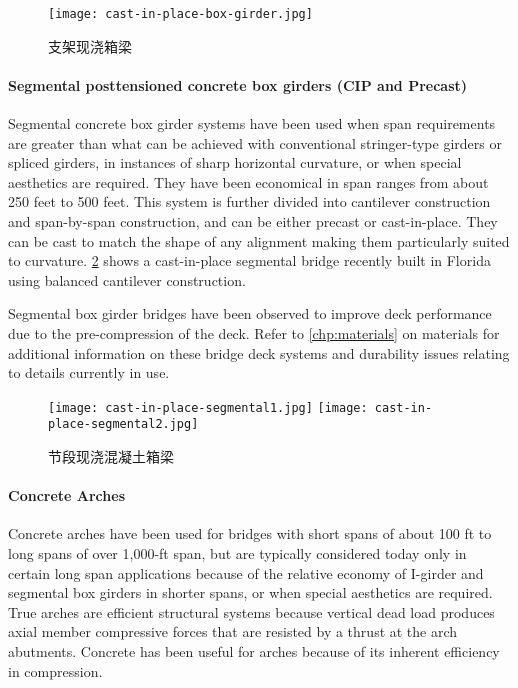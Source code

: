 \begin{figure}
  \texttt{[image: cast-in-place-box-girder.jpg]}
  \caption{支架现浇箱梁}
  \label{fig:cast-in-place-box-girder}
\end{figure}

\paragraph{Segmental posttensioned concrete box girders (CIP and Precast)}

Segmental concrete box girder systems have been used when span requirements are greater than what can be
achieved with conventional stringer-type girders or spliced girders, in instances of sharp horizontal curvature, or
when special aesthetics are required. They have been economical in span ranges from about 250 feet to 500 feet.
This system is further divided into cantilever construction and span-by-span construction, and can be either precast or
cast-in-place. They can be cast to match the shape of any alignment making them particularly suited to curvature.
\cref{fig:cast-in-place-segmental} shows a cast-in-place segmental bridge recently built in Florida using balanced cantilever construction.

Segmental box girder bridges have been observed to improve deck performance due to the pre-compression of
the deck. Refer to \cref{chp:materials} on materials for additional information on these bridge deck systems and durability
issues relating to details currently in use.

\begin{figure}
  \texttt{[image: cast-in-place-segmental1.jpg]}\hfill
  \texttt{[image: cast-in-place-segmental2.jpg]}
  \caption{节段现浇混凝土箱梁}
  \label{fig:cast-in-place-segmental}
\end{figure}

\paragraph{Concrete Arches}

Concrete arches have been used for bridges with short spans of about 100 ft to long spans of over 1,000-ft span,
but are typically considered today only in certain long span applications because of the relative economy of I-girder
and segmental box girders in shorter spans, or when special aesthetics are required. True arches are efficient
structural systems because vertical dead load produces axial member compressive forces that are resisted by a thrust
at the arch abutments. Concrete has been useful for arches because of its inherent efficiency in compression.


